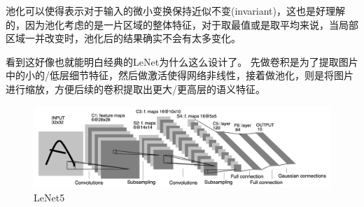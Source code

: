 池化可以使得表示对于输入的微小变换保持近似不变(invariant)，这也是好理解的，因为池化考虑的是一片区域的整体特征，对于取最值或是取平均来说，当局部区域一并改变时，池化后的结果确实不会有太多变化。

\bigskip
\begin{tcolorbox}
看到这好像也就能明白经典的LeNet为什么这么设计了。
先做卷积是为了提取图片中的小的/低层细节特征，然后做激活使得网络非线性，接着做池化，则是将图片进行缩放，方便后续的卷积提取出更大/更高层的语义特征。
\begin{figure}[H]
\centering
\includegraphics[width=\linewidth]{fig/lenet.png}
\caption{LeNet5}
\end{figure}
\end{tcolorbox}